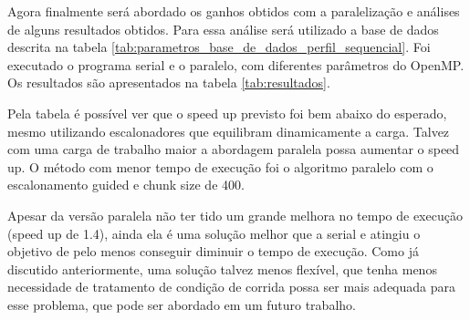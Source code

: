 \documentclass{article}
\begin{document}
Agora finalmente será abordado os ganhos obtidos com a paralelização e análises de alguns resultados obtidos. Para essa análise será utilizado a base de dados descrita na tabela \ref{tab:parametros_base_de_dados_perfil_sequencial}. Foi executado o programa serial e o paralelo, com diferentes parâmetros do OpenMP. Os resultados são apresentados na tabela \ref{tab:resultados}.

Pela tabela é possível ver que o speed up previsto foi bem abaixo do esperado, mesmo utilizando escalonadores que equilibram dinamicamente a carga. Talvez com uma carga de trabalho maior a abordagem paralela possa aumentar o speed up. O método com menor tempo de execução foi o algoritmo paralelo com o escalonamento guided e chunk size de 400.

Apesar da versão paralela não ter tido um grande melhora no tempo de execução (speed up de 1.4), ainda ela é uma solução melhor que a serial e atingiu o objetivo de pelo menos conseguir diminuir o tempo de execução. Como já discutido anteriormente, uma solução talvez menos flexível, que tenha menos necessidade de tratamento de condição de corrida possa ser mais adequada para esse problema, que pode ser abordado em um futuro trabalho.

\end{document}
